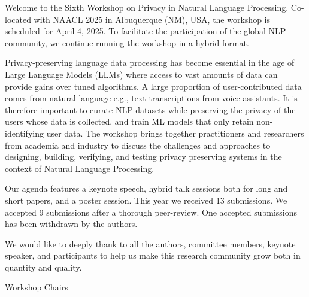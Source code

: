 Welcome to the Sixth Workshop on Privacy in Natural Language Processing. Co-located with NAACL 2025 in Albuquerque (NM), USA, the workshop is scheduled for April 4, 2025. To facilitate the participation of the global NLP community, we continue running the workshop in a hybrid format.
\bigskip


Privacy-preserving language data processing has become essential in the age of Large Language Models (LLMs) where access to vast amounts of data can provide gains over tuned algorithms. A large proportion of user-contributed data comes from natural language e.g., text transcriptions from voice assistants. It is therefore important to curate NLP datasets while preserving the privacy of the users whose data is collected, and train ML models that only retain non-identifying user data.
The workshop brings together practitioners and researchers from academia and industry to discuss the challenges and approaches to designing, building, verifying, and testing privacy preserving systems in the context of Natural Language Processing.
\bigskip


Our agenda features a keynote speech, hybrid talk sessions both for long and short papers, and a poster session. This year we received 13 submissions. We accepted 9 submissions after a thorough peer-review. One accepted submissions has been withdrawn by the authors.
\bigskip


We would like to deeply thank to all the authors, committee members, keynote speaker, and participants to help us make this research community grow both in quantity and quality.
\bigskip

Workshop Chairs